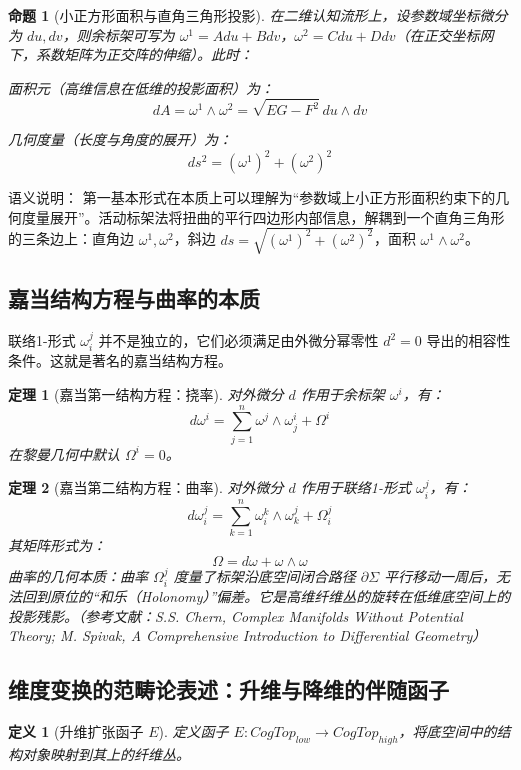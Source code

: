 \documentclass[11pt,a4paper]{article}
\newtheorem{theorem}{定理}
\newtheorem{definition}{定义}
\newtheorem{proposition}{命题}
\begin{document}
\begin{proposition}[小正方形面积与直角三角形投影]
在二维认知流形上，设参数域坐标微分为 \(du,dv\)，则余标架可写为 \(\omega^1=Adu+Bdv\)，\(\omega^2=Cdu+Ddv\)（在正交坐标网下，系数矩阵为正交阵的伸缩）。此时：

面积元（高维信息在低维的投影面积）为：
\[
dA=\omega^1\wedge\omega^2=\sqrt{EG-F^2}\,du\wedge dv
\]

几何度量（长度与角度的展开）为：
\[
ds^2=(\omega^1)^2+(\omega^2)^2
\]
\end{proposition}

语义说明：
第一基本形式在本质上可以理解为“参数域上小正方形面积约束下的几何度量展开”。活动标架法将扭曲的平行四边形内部信息，解耦到一个直角三角形的三条边上：直角边 \(\omega^1,\omega^2\)，斜边 \(ds=\sqrt{(\omega^1)^2+(\omega^2)^2}\)，面积 \(\omega^1\wedge\omega^2\)。

\subsection{嘉当结构方程与曲率的本质}
联络1-形式 \(\omega_i^j\) 并不是独立的，它们必须满足由外微分幂零性 \(d^2=0\) 导出的相容性条件。这就是著名的嘉当结构方程。

\begin{theorem}[嘉当第一结构方程：挠率]
对外微分 \(d\) 作用于余标架 \(\omega^i\)，有：
\[
d\omega^i=\sum_{j=1}^n \omega^j\wedge\omega_j^i+\Omega^i
\]
在黎曼几何中默认 \(\Omega^i=0\)。
\end{theorem}

\begin{theorem}[嘉当第二结构方程：曲率]
对外微分 \(d\) 作用于联络1-形式 \(\omega_i^j\)，有：
\[
d\omega_i^j=\sum_{k=1}^n \omega_i^k\wedge\omega_k^j+\Omega_i^j
\]
其矩阵形式为：
\[
\Omega=d\omega+\omega\wedge\omega
\]
曲率的几何本质：曲率 \(\Omega_i^j\) 度量了标架沿底空间闭合路径 \(\partial\Sigma\) 平行移动一周后，无法回到原位的“和乐（Holonomy）”偏差。它是高维纤维丛的旋转在低维底空间上的投影残影。（参考文献：S.S. Chern, \textit{Complex Manifolds Without Potential Theory}; M. Spivak, \textit{A Comprehensive Introduction to Differential Geometry}）
\end{theorem}

\subsection{维度变换的范畴论表述：升维与降维的伴随函子}
\begin{definition}[升维扩张函子 \(E\)]
定义函子 \(E:CogTop_{low}\to CogTop_{high}\)，将底空间中的结构对象映射到其上的纤维丛。
\end{definition}
\end{document}
